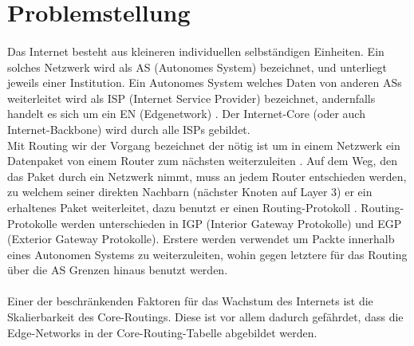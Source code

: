 \section{Problemstellung}


\paragraph{}
Das Internet besteht aus kleineren individuellen selbständigen Einheiten. Ein solches Netzwerk wird als AS (Autonomes System) bezeichnet, und unterliegt jeweils einer Institution. Ein Autonomes System welches Daten von anderen ASs weiterleitet wird als ISP (Internet Service Provider) bezeichnet, andernfalls handelt es sich um ein EN  (Edgenetwork) \cite{Mahorta:2002:IR}. Der Internet-Core (oder auch Internet-Backbone) wird durch alle ISPs gebildet.\\

Mit Routing wir der Vorgang bezeichnet der nötig ist um in einem Netzwerk ein Datenpaket von einem Router zum nächsten weiterzuleiten \cite{Mahorta:2002:IR}. Auf dem Weg, den das Paket durch ein Netzwerk nimmt, muss an jedem Router entschieden werden, zu welchem seiner direkten Nachbarn (nächster Knoten auf Layer 3) er ein erhaltenes Paket weiterleitet, dazu benutzt er einen Routing-Protokoll \cite{Tanenbaum:2003:CN}. Routing-Protokolle werden unterschieden in IGP (Interior Gateway Protokolle) und EGP (Exterior Gateway Protokolle). Erstere werden verwendet um Packte innerhalb eines Autonomen Systems zu weiterzuleiten, wohin gegen letztere für das Routing über die AS Grenzen hinaus benutzt werden.\\

\paragraph{}
Einer der beschränkenden Faktoren für das Wachstum des Internets ist die Skalierbarkeit des Core-Routings. Diese ist vor allem dadurch gefährdet, dass die Edge-Networks in der Core-Routing-Tabelle abgebildet werden.

